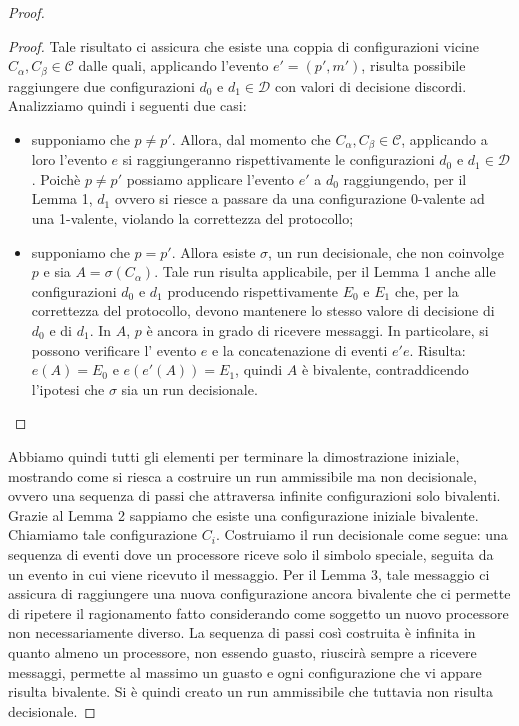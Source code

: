 \documentclass{article}
\begin{document}
\begin{proof}
\begin{proof}
Tale risultato ci assicura che esiste una coppia di configurazioni vicine $C_{\alpha}, C_{\beta} \in \mathcal{C}$ dalle quali, applicando l'evento $e'=(p',m')$, risulta possibile raggiungere due configurazioni $d_0$ e $d_1 \in \mathcal{D}$ con valori di decisione discordi. Analizziamo quindi i seguenti due casi:
\begin{itemize}
\item supponiamo che $p \neq p'$. Allora, dal momento che $C_{\alpha}, C_{\beta} \in \mathcal{C}$, applicando a loro l'evento $e$ si raggiungeranno rispettivamente le configurazioni $d_0$ e $d_1 \in \mathcal{D}$. Poichè $p\neq p'$ possiamo applicare l'evento $e'$ a $d_0$ raggiungendo, per il Lemma 1, $d_1$ ovvero si riesce a passare da una configurazione 0-valente ad una 1-valente, violando la correttezza del protocollo;
\item supponiamo che $p=p'$. Allora esiste $\sigma$, un run decisionale, che non coinvolge $p$ e sia $A=\sigma(C_{\alpha})$. Tale run risulta applicabile, per il Lemma 1 anche alle configurazioni $d_0$ e $d_1$ producendo rispettivamente $E_0$ e $E_1$ che, per la correttezza del protocollo, devono mantenere lo stesso valore di decisione di $d_0$ e di $d_1$. In $A$, $p$ è ancora in grado di ricevere messaggi. In particolare, si possono verificare l' evento $e$ e la concatenazione di eventi $e'e$. Risulta: $e(A)=E_0$ e $e(e'(A))=E_1$, quindi $A$ è bivalente, contraddicendo l'ipotesi che $\sigma$ sia un run decisionale.        
\end{itemize} 
\end{proof}
Abbiamo quindi tutti gli elementi per terminare la dimostrazione iniziale, mostrando come si riesca a costruire un run ammissibile ma non decisionale, ovvero una sequenza di passi che attraversa infinite configurazioni solo bivalenti. \\
Grazie al Lemma 2 sappiamo che esiste una configurazione iniziale bivalente. Chiamiamo tale configurazione $C_i$. Costruiamo il run decisionale come segue: una sequenza di eventi dove un processore riceve solo il simbolo speciale, seguita da un evento in cui viene ricevuto il messaggio.  Per il Lemma 3, tale messaggio ci assicura di raggiungere una nuova configurazione ancora bivalente che ci permette di ripetere il ragionamento fatto considerando come soggetto un nuovo processore non necessariamente diverso. La sequenza di passi così costruita è infinita in quanto almeno un processore, non essendo guasto, riuscirà sempre a ricevere messaggi, permette al massimo un guasto e ogni configurazione che vi appare risulta bivalente. Si è quindi creato un run ammissibile che tuttavia non risulta decisionale.    
\end{proof}
\end{document}
